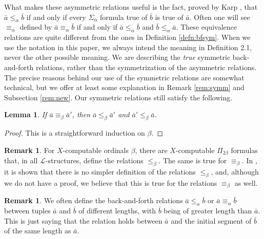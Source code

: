 \documentclass[10pt,a4paper]{article}
\newtheorem{lem}[thm]{Lemma}
\theoremstyle{definition}
\newtheorem{remark}[thm]{Remark}
\begin{document}
	What makes these asymmetric relations useful is the fact, proved by Karp \cite{Karp}, that $\bar{a} \leq_\alpha \bar{b}$ if and only if every $\Sigma_\alpha$ formula true of $\bar{b}$ is true of $\bar{a}$. Often one will see $\equiv_\alpha$ defined by $\bar{a} \equiv_\alpha \bar{b}$ if and only if $\bar{a} \leq_\alpha \bar{b}$ and $\bar{b} \leq_\alpha \bar{a}$. These equivalence relations are quite different from the ones in Definition \ref{defn:bfsym}. When we use the notation in this paper, we always intend the meaning in Definition 2.1, never the other possible meaning. We are describing the \textit{true} symmetric back-and-forth relations, rather than the symmetrization of the asymmetric relations. The precise reasons behind our use of the symmetric relations are somewhat technical, but we offer at least some explanation in Remark \ref{rem:symm} and Subsection \ref{rem:new}. Our symmetric relations still satisfy the following.
	
	\begin{lem}
		
		If $\bar{a}\equiv_\beta\bar{a}'$, then $\bar{a}\leq_\beta\bar{a}'$ and $\bar{a}'\leq_\beta\bar{a}$.
		
	\end{lem}
	
	\begin{proof}
		
		This is a straightforward induction on $\beta$.
	\end{proof}
	
	\begin{remark}
		For $X$-computable ordinals $\beta$, there are $X$-computable $\Pi_{2\beta}$ formulas that, in all $\mathcal{L}$-structures, define the relations $\leq_\beta$. The same is true for $\equiv_\beta$. In \cite{ChenGonzalezHT}, it is shown that there is no simpler definition of the relations $\leq_\beta$, and, although we do not have a proof, we believe that this is true for the relations $\equiv_\beta$ as well.
	\end{remark}
	
	\begin{remark}
		We often define the back-and-forth relations $\bar{a}\leq_\alpha\bar{b}$ or $\bar{a}\equiv_\alpha\bar{b}$ between tuples $\bar{a}$ and $\bar{b}$ of different lengths, with $\bar{b}$ being of greater length than $\bar{a}$. This is just saying that the relation holds between $\bar{a}$ and the initial segment of $\bar{b}$ of the same length as $\bar{a}$.
	\end{remark}
	
\end{document}
